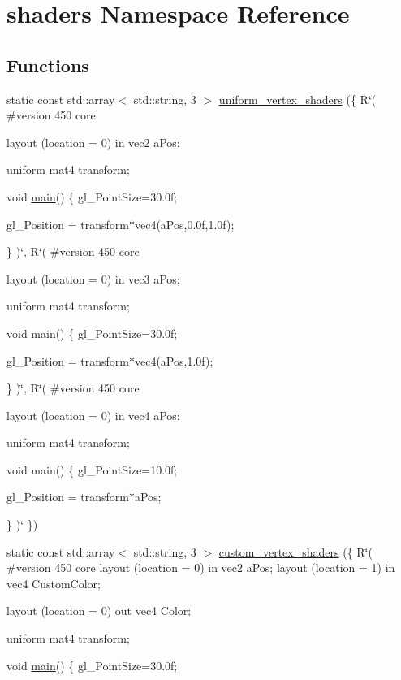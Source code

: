 \hypertarget{namespaceshaders}{}\section{shaders Namespace Reference}
\label{namespaceshaders}
\subsection*{Functions}
\begin{DoxyCompactItemize}
\item 
static const std\+::array$<$ std\+::string, 3 $>$ \mbox{\hyperlink{namespaceshaders_a800ae51b672756c1d98fe5ef773f2b3d}{uniform\+\_\+vertex\+\_\+shaders}} (\{ R\char`\"{}(
\#version 450 core

layout (location = 0) in vec2 a\+Pos;

uniform mat4 transform;

void \mbox{\hyperlink{gtest__tests_8cpp_a3c04138a5bfe5d72780bb7e82a18e627}{main}}()
\{
gl\+\_\+\+Point\+Size=30.\+0f;

gl\+\_\+\+Position = transform$\ast$vec4(a\+Pos,0.\+0f,1.\+0f);


\}
)\char`\"{}, R\char`\"{}(
\#version 450 core

layout (location = 0) in vec3 a\+Pos;

uniform mat4 transform;

void main()
\{
gl\+\_\+\+Point\+Size=30.\+0f;

gl\+\_\+\+Position = transform$\ast$vec4(a\+Pos,1.\+0f);

\}
)\char`\"{}, R\char`\"{}(
\#version 450 core

layout (location = 0) in vec4 a\+Pos;

uniform mat4 transform;

void main()
\{
gl\+\_\+\+Point\+Size=10.\+0f;

gl\+\_\+\+Position = transform$\ast$a\+Pos;

\}
)\char`\"{} \})
\item 
static const std\+::array$<$ std\+::string, 3 $>$ \mbox{\hyperlink{namespaceshaders_ab9d754beb253e36c2805513fdf473da8}{custom\+\_\+vertex\+\_\+shaders}} (\{ R\char`\"{}(
\#version 450 core
layout (location = 0) in vec2 a\+Pos;
layout (location = 1) in vec4 Custom\+Color;

layout (location = 0) out vec4 Color;

uniform mat4 transform;

void \mbox{\hyperlink{gtest__tests_8cpp_a3c04138a5bfe5d72780bb7e82a18e627}{main}}()
\{
gl\+\_\+\+Point\+Size=30.\+0f;


\end{DoxyCompactItemize}
